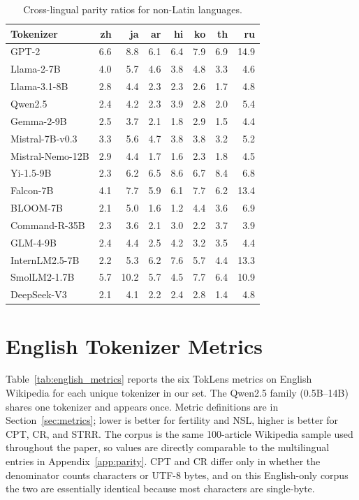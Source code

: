 \documentclass[11pt]{article}
\begin{document}
\begin{table}[H]
\centering
\small
\begin{tabular}{lrrrrrrr}
\toprule
\textbf{Tokenizer} & \textbf{zh} & \textbf{ja} & \textbf{ar} & \textbf{hi} & \textbf{ko} & \textbf{th} & \textbf{ru} \\
\midrule
GPT-2 & 6.6 & 8.8 & 6.1 & 6.4 & 7.9 & 6.9 & 14.9 \\
Llama-2-7B & 4.0 & 5.7 & 4.6 & 3.8 & 4.8 & 3.3 & 4.6 \\
Llama-3.1-8B & 2.8 & 4.4 & 2.3 & 2.3 & 2.6 & 1.7 & 4.8 \\
Qwen2.5 & 2.4 & 4.2 & 2.3 & 3.9 & 2.8 & 2.0 & 5.4 \\
Gemma-2-9B & 2.5 & 3.7 & 2.1 & 1.8 & 2.9 & 1.5 & 4.4 \\
Mistral-7B-v0.3 & 3.3 & 5.6 & 4.7 & 3.8 & 3.8 & 3.2 & 5.2 \\
Mistral-Nemo-12B & 2.9 & 4.4 & 1.7 & 1.6 & 2.3 & 1.8 & 4.5 \\
Yi-1.5-9B & 2.3 & 6.2 & 6.5 & 8.6 & 6.7 & 8.4 & 6.8 \\
Falcon-7B & 4.1 & 7.7 & 5.9 & 6.1 & 7.7 & 6.2 & 13.4 \\
BLOOM-7B & 2.1 & 5.0 & 1.6 & 1.2 & 4.4 & 3.6 & 6.9 \\
Command-R-35B & 2.3 & 3.6 & 2.1 & 3.0 & 2.2 & 3.7 & 3.9 \\
GLM-4-9B & 2.4 & 4.4 & 2.5 & 4.2 & 3.2 & 3.5 & 4.4 \\
InternLM2.5-7B & 2.2 & 5.3 & 6.2 & 7.6 & 5.7 & 4.4 & 13.3 \\
SmolLM2-1.7B & 5.7 & 10.2 & 5.7 & 4.5 & 7.7 & 6.4 & 10.9 \\
DeepSeek-V3 & 2.1 & 4.1 & 2.2 & 2.4 & 2.8 & 1.4 & 4.8 \\
\bottomrule
\end{tabular}
\caption{Cross-lingual parity ratios for non-Latin languages.}
\label{tab:parity}
\end{table}

\section{English Tokenizer Metrics}
\label{app:english}

Table~\ref{tab:english_metrics} reports the six TokLens metrics on English Wikipedia for each unique tokenizer in our set. The Qwen2.5 family (0.5B--14B) shares one tokenizer and appears once. Metric definitions are in Section~\ref{sec:metrics}; lower is better for fertility and NSL, higher is better for CPT, CR, and STRR. The corpus is the same 100-article Wikipedia sample used throughout the paper, so values are directly comparable to the multilingual entries in Appendix~\ref{app:parity}. CPT and CR differ only in whether the denominator counts characters or UTF-8 bytes, and on this English-only corpus the two are essentially identical because most characters are single-byte.
\end{document}
